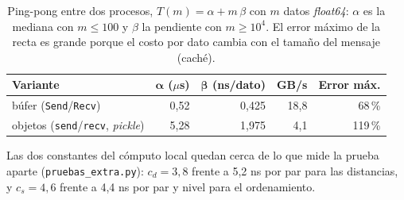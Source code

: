 \documentclass[11pt,a4paper]{article}
\begin{document}
\begin{table}[!htb]
\centering
\small
\begin{tabular}{lrrrr}
\toprule
\textbf{Variante} & $\boldsymbol{\alpha}$ ($\mu$s) & $\boldsymbol{\beta}$ (ns/dato) & \textbf{GB/s} & \textbf{Error máx.} \\
\midrule
búfer (\texttt{Send}/\texttt{Recv}) & 0,52 & 0,425 & 18,8 & 68\,\% \\
objetos (\texttt{send}/\texttt{recv}, \textit{pickle}) & 5,28 & 1,975 & 4,1 & 119\,\% \\
\bottomrule
\end{tabular}
\caption{Ping-pong entre dos procesos, $T(m) = \alpha + m\,\beta$ con $m$ datos \textit{float64}: $\alpha$ es la mediana con $m \le 100$ y $\beta$ la pendiente con $m \ge 10^4$. El error máximo de la recta es grande porque el costo por dato cambia con el tamaño del mensaje (caché).}
\label{tab:pingpong}
\end{table}

Las dos constantes del cómputo local quedan cerca de lo que mide la prueba aparte (\texttt{pruebas\_\allowbreak extra.py}): $c_d = 3{,}8$ frente a 5,2 ns por par para las distancias, y $c_s = 4{,}6$ frente a 4,4 ns por par y nivel para el ordenamiento.
\end{document}
